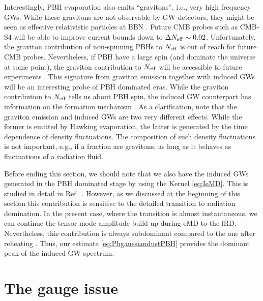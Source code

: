 \documentclass[a4paper,11pt]{article}
\numberwithin{equation}{section}
\begin{document}
Interestingly, PBH evaporation also emits ``gravitons'', i.e., very high frequency GWs. While these gravitons are not observable by GW detectors, they might be seen as effective relativistic particles at BBN \cite{Dong:2015yjs,Arbey:2019jmj,Kuhnel:2019zbc,Arbey:2021ysg,Masina:2021zpu}. Future CMB probes such as CMB-S4 \cite{Abazajian:2016yjj} will be able to improve current bounds down to $\Delta N_{\rm eff}\sim 0.02$. Unfortunately, the graviton contribution of non-spinning PBHs to $N_{\rm eff}$ is out of reach for future CMB probes. Nevertheless, if PBH have a large spin (and dominate the universe at some point), the graviton contribution to $N_{\rm eff}$ will be accessible to future experiments \cite{Arbey:2021ysg,Masina:2021zpu}. This signature from graviton emission together with induced GWs will be an interesting probe of PBH dominated eras. While the graviton contribution to $N_{\rm eff}$ tells us about PBH spin, the induced GW counterpart has information on the formation mechanism \cite{Domenech:2021wkk}. As a clarification, note that the graviton emission and induced GWs are two very different effects. While the former is emitted by Hawking evaporation, the latter is generated by the time dependence of density fluctuations. The composition of such density fluctuations is not important, e.g., if a fraction are gravitons, as long as it behaves as fluctuations of a radiation fluid.

Before ending this section, we should note that we also have the induced GWs generated in the PBH dominated stage by using the Kernel \eqref{eq:IeMD}. This is studied in detail in Ref.~\cite{Papanikolaou:2020qtd}. However, as we discussed at the beginning of this section this contribution is sensitive to the detailed transition to radiation domination. In the present case, where the transition is almost instantaneous, we can continue the tensor mode amplitude build up during eMD to the lRD. Nevertheless, this contribution is always subdominant compared to the one after reheating \cite{Inomata:2019ivs}. Thus, our estimate \eqref{eq:PhgaussiandustPBH} provides the dominant peak of the induced GW spectrum. 




\section{The gauge issue \label{sec:gauge}}
\end{document}
